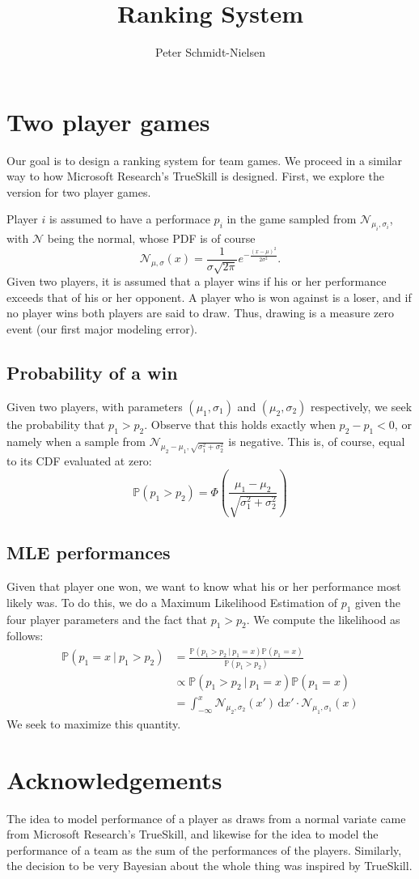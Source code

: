 \documentclass[12pt]{article}
\title{Ranking System}
\author{Peter Schmidt-Nielsen}
\begin{document}
\maketitle

\section{Two player games}
Our goal is to design a ranking system for team games.
We proceed in a similar way to how Microsoft Research's TrueSkill is designed.
First, we explore the version for two player games.

Player $i$ is assumed to have a performace $p_i$ in the game sampled from $\mathcal{N}_{\mu_i, \sigma_i}$, with
$\mathcal{N}$ being the normal, whose PDF is of course
\[ \mathcal{N}_{\mu, \sigma}(x) = \frac1{\sigma \sqrt{2 \pi}} e^{-\frac{(x-\mu)^2}{2\sigma^2}}. \]
Given two players, it is assumed that a player wins if his or her performance exceeds that of his or her opponent.
A player who is won against is a loser, and if no player wins both players are said to draw.
Thus, drawing is a measure zero event (our first major modeling error).

\subsection{Probability of a win}
Given two players, with parameters $(\mu_1, \sigma_1)$ and $(\mu_2, \sigma_2)$ respectively, we seek the probability that $p_1 > p_2$.
Observe that this holds exactly when $p_2 - p_1 < 0$, or namely when a sample from $\mathcal{N}_{\mu_2 - \mu_1,\sqrt{\sigma_1^2 + \sigma_2^2}}$ is negative.
This is, of course, equal to its CDF evaluated at zero:
\[ \mathbb{P}(p_1 > p_2) = \Phi\left(\frac{\mu_1 - \mu_2}{\sqrt{\sigma_1^2 + \sigma_2^2}}\right) \]

\subsection{MLE performances}
Given that player one won, we want to know what his or her performance most likely was.
To do this, we do a Maximum Likelihood Estimation of $p_1$ given the four player parameters and the fact that $p_1 > p_2$.
We compute the likelihood as follows:
\begin{align*}
\mathbb{P}(p_1 = x\ |\ p_1 > p_2) &= \frac{\mathbb{P}(p_1 > p_2\ |\ p_1 = x) \mathbb{P}(p_1 = x)}{\mathbb{P}(p_1 > p_2)} \\
&\propto \mathbb{P}(p_1 > p_2\ |\ p_1 = x) \mathbb{P}(p_1 = x) \\
&= \int_{-\infty}^x \mathcal{N}_{\mu_2, \sigma_2}(x') \, \mathrm{d}x' \cdot \mathcal{N}_{\mu_1, \sigma_1}(x)
\end{align*}
We seek to maximize this quantity.

\section{Acknowledgements}
The idea to model performance of a player as draws from a normal variate came from Microsoft Research's TrueSkill, and likewise for the idea to model the performance of a team as the sum of the performances of the players.
Similarly, the decision to be very Bayesian about the whole thing was inspired by TrueSkill.
\end{document}
